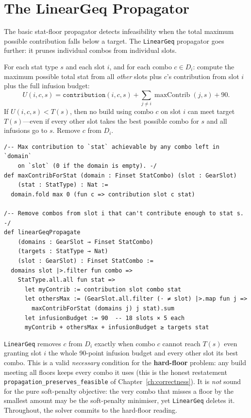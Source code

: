 \documentclass[11pt, a4paper, oneside]{book}
\newcommand{\maxContrib}{\operatorname{maxContrib}}
\begin{document}
\section{The LinearGeq Propagator}

The basic stat-floor propagator detects infeasibility when the total
maximum possible contribution falls below a target.  The \texttt{LinearGeq}
propagator goes further: it prunes individual combos from individual slots.

\begin{defbox}[title={LinearGeq Propagator}]
For each stat type $s$ and each slot $i$, and for each combo $c \in D_i$:
compute the maximum possible total stat from all \emph{other} slots plus
$c$'s contribution from slot $i$ plus the full infusion budget:
\[
  U(i, c, s) = \texttt{contribution}(i, c, s) + \sum_{j \neq i} \maxContrib(j, s) + 90.
\]
If $U(i, c, s) < T(s)$, then no build using combo $c$ on slot $i$ can
meet target $T(s)$---even if every other slot takes the best possible
combo for $s$ and all infusions go to $s$.  Remove $c$ from $D_i$.
\end{defbox}

\begin{leanbox}[title={Lean 4 (Mathlib) --- LinearGeq Propagator}]
\begin{verbatim}
/-- Max contribution to `stat` achievable by any combo left in `domain`
    on `slot` (0 if the domain is empty). -/
def maxContribForStat (domain : Finset StatCombo) (slot : GearSlot)
    (stat : StatType) : Nat :=
  domain.fold max 0 (fun c => contribution slot c stat)

/-- Remove combos from slot i that can't contribute enough to stat s. -/
def linearGeqPropagate
    (domains : GearSlot → Finset StatCombo)
    (targets : StatType → Nat)
    (slot : GearSlot) : Finset StatCombo :=
  domains slot |>.filter fun combo =>
    StatType.all.all fun stat =>
      let myContrib := contribution slot combo stat
      let othersMax := (GearSlot.all.filter (· ≠ slot) |>.map fun j =>
        maxContribForStat (domains j) j stat).sum
      let infusionBudget := 90  -- 18 slots × 5 each
      myContrib + othersMax + infusionBudget ≥ targets stat
\end{verbatim}
\end{leanbox}

\begin{warningbox}[title={LinearGeq is sound for hard floors, not for the soft penalty}]
\texttt{LinearGeq} removes $c$ from $D_i$ exactly when combo $c$ cannot reach
$T(s)$ even granting slot $i$ the whole 90-point infusion budget and every other
slot its best combo.  This is a valid \emph{necessary} condition for the
\textbf{hard-floor} problem: any build meeting all floors keeps every combo it
uses (this is the honest restatement \texttt{propagation\_preserves\_feasible}
of Chapter~\ref{ch:correctness}).  It is \emph{not} sound for the pure
soft-penalty objective: the very combo that misses a floor by the smallest
amount may be the soft-penalty minimiser, yet \texttt{LinearGeq} deletes it.
Throughout, the solver commits to the hard-floor reading.
\end{warningbox}
\end{document}
